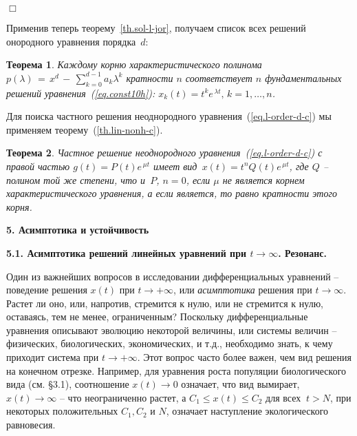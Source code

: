 \documentclass[12pt,a4paper]{article}
\newtheorem{theorem}{Теорема}
\begin{document}
   {\hfill $\Box$}
\medskip


Применив теперь теорему~\ref{th.sol-l-jor}, получаем список всех решений
онородного уравнения порядка~$d$:
\begin{theorem}\label{th.l-order-d-c}
Каждому корню характеристического полинома $p(\lambda) \, = \, x^d \, - \, \sum_{k=0}^{d-1} a_k \lambda^k$
кратности $n$ соответствует $n$ фундаментальных решений уравнения~(\ref{eq.const10h}):
$x_k(t) = t^k e^{\, \lambda t}, \, k = 1, \ldots , n$.
\end{theorem}
  Для поиска частного решения неоднородного уравнения~(\ref{eq.l-order-d-c}) мы применяем теорему~(\ref{th.lin-nonh-c}).
\begin{theorem}\label{th.lin-d-nonh-c}
Частное решение неоднородного уравнения~(\ref{eq.l-order-d-c}) с правой частью $g(t) = P(t) e^{\, \mu t}$
имеет вид~$x(t) =  t^nQ(t)e^{\, \mu t}$, где $Q$ -- полином той же степени, что и~$P$, $n = 0$, если $\mu$
не является корнем характеристического уравнения, а если является, то равно кратности этого корня.
\end{theorem}

\newpage 

\bigskip

\begin{center}
\large{\textbf{5. Асимптотика и устойчивость}}
\end{center}

\bigskip

\begin{center}
\textbf{5.1. Асимптотика решений линейных уравнений при $t \to \infty$. Резонанс.}
\end{center}

\bigskip

Один из важнейших вопросов в исследовании дифференциальных уравнений --
поведение  решения $x(t)$ при $t \to +\infty$, или {\em асимптотика} решения при $t\to \infty$.
Растет ли оно, или, напротив, стремится к нулю,
или не стремится к нулю, оставаясь, тем не менее, ограниченным? Поскольку дифференциальные уравнения
описывают эволюцию некоторой величины, или системы величин -- физических, биологических, экономических, и т.д.,
необходимо знать, к чему приходит система при $t \to +\infty$. Этот вопрос часто более важен, чем вид решения на конечном отрезке.  Например, для уравнения
роста популяции биологического вида (см. \S 3.1), соотношение $x(t)
\to 0$ означает, что вид вымирает, $x(t) \to \infty$ -- что неограниченно растет, а $C_1 \le x(t) \le C_2$ для всех 
 $\ t > N$, 
при некоторых положительных $C_1, C_2$ и $N$, означает наступление экологического равновесия.
\end{document}
